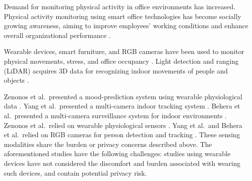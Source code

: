 %
Demand for monitoring physical activity in office environments has increased.
%
Physical activity monitoring using smart office technologies has become socially growing awareness, aiming to improve employees' working conditions and enhance overall organizational performance \cite{PAPAGIANNIDIS2020102027}.
%

%
Wearable devices, smart furniture, and RGB cameras have been used to monitor physical movements, stress, and office occupancy \cite{6627764,mozos2017stress,ouwerkerk2013wireless,krejcar2019smart,9216892,vlaovic2022smart,ayers2001monitoring,antonino2019office}.
Light detection and ranging (LiDAR) acquires 3D data for recognizing indoor movements of people and objects \cite{9795869,oka2021spatial,10159661}.

Zenonos et al.\ presented a mood-prediction system using wearable physiological data \cite{7457166}.
Yang et al.\ presented a multi-camera indoor tracking system \cite{4284740}.
Behera et al.\ presented a multi-camera surveillance system for indoor environments \cite{6409058}.
Zenonos et al.\ relied on wearable physiological sensors \cite{7457166}.
Yang et al.\ and Behera et al.\ relied on RGB cameras for person detection and tracking \cite{4284740,6409058}.
These sensing modalities share the burden or privacy concerns described above.
The aforementioned studies have the following challenges:
studies using wearable devices have not considered the discomfort and burden associated with wearing such devices, and contain potential privacy risk.

